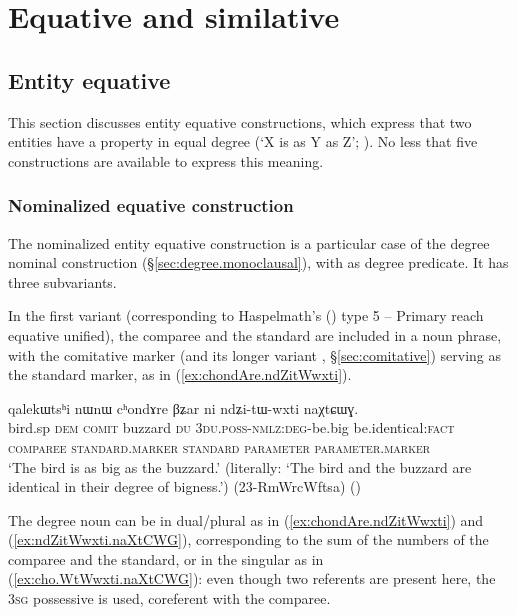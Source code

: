 \section{Equative and similative}


\subsection{Entity equative} \label{sec:equative}
This section discusses entity equative constructions, which express that two entities have a property in equal degree (`X is as Y as Z'; \citealt{haspelmath08equative}). No less that five constructions are available to express this meaning.

\subsubsection{Nominalized equative construction} \label{sec:nmlz.equative}
The nominalized entity equative construction is a particular case of the degree nominal construction (§\ref{sec:degree.monoclausal}), with  as degree predicate. It has three subvariants.

In the first variant (corresponding to Haspelmath's (\citeyear{haspelmath17equative}) type 5 -- Primary reach equative unified), the comparee and the standard are included in a noun phrase, with the comitative marker  (and its longer variant , §\ref{sec:comitative}) serving as the standard marker, as in (\ref{ex:chondAre.ndZitWwxti}).

\begin{exe}
\ex \label{ex:chondAre.ndZitWwxti}
\glll qalekɯtsʰi nɯnɯ cʰondɤre βʑar ni ndʑi-tɯ-wxti naχtɕɯɣ.\\
bird.sp \textsc{dem} \textsc{comit} buzzard \textsc{du} \textsc{3du}.\textsc{poss}-\textsc{nmlz}:\textsc{deg}-be.big be.identical:\textsc{fact} \\
{\textsc{comparee}} { } \textsc{standard}.\textsc{marker} {\textsc{standard}} { } \textsc{parameter} \textsc{parameter}.\textsc{marker} \\
\glt `The  bird is as big as the buzzard.' (literally: `The  bird and the buzzard are identical in their degree of bigness.')  (23-RmWrcWftsa)
()
\end{exe}

The degree noun can be in dual/plural as in (\ref{ex:chondAre.ndZitWwxti}) and (\ref{ex:ndZitWwxti.naXtCWG}), corresponding to the sum of the numbers of the comparee and the standard, or in the  singular as in (\ref{ex:cho.WtWwxti.naXtCWG}): even though two referents are present here, the \textsc{3sg} possessive  is used, coreferent with the comparee. 


